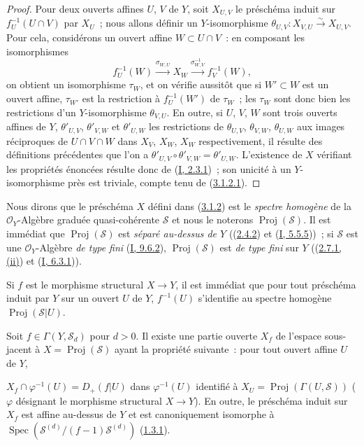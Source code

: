 \begin{proof}
Pour deux ouverts affines $U$, $V$ de $Y$, soit $X_{U,V}$ le préschéma
induit sur $f_U^{-1}(U\cap V)$ par $X_U$~; nous allons définir un
$Y$-isomorphisme $\theta_{U,V}:X_{V,U}\xrightarrow{\sim}X_{U,V}$. Pour cela,
considérons un ouvert affine $W\subset U\cap V$~: en composant les
isomorphismes
\[
  f_U^{-1}(W)\xrightarrow{\sigma_{W,U}}X_W
  \xrightarrow{\sigma_{W,V}^{-1}}f_V^{-1}(W),
\]
on obtient un isomorphisme $\tau_W$, et on vérifie aussitôt que si
$W'\subset W$ est un ouvert affine, $\tau_{W'}$ est la restriction à
$f_U^{-1}(W')$ de $\tau_W$~; les $\tau_W$ sont donc bien les restrictions
d'un $Y$-isomorphisme $\theta_{V,U}$. En outre, si $U$, $V$, $W$ sont trois
ouverts affines de $Y$, $\theta'_{U,V}$, $\theta'_{V,W}$ et
$\theta'_{U,W}$ les restrictions de $\theta_{U,V}$, $\theta_{V,W}$,
$\theta_{U,W}$ aux images réciproques de $U\cap V\cap W$ dans $X_V$, $X_W$,
$X_W$ respectivement, il résulte des définitions précédentes que l'on a
$\theta'_{U,V}\circ\theta'_{V,W}=\theta'_{U,W}$. L'existence de $X$
vérifiant les propriétés énoncées résulte donc de
(\hyperref[I.2.3.1-fr]{I, 2.3.1})~; son unicité à un $Y$-isomorphisme près
est triviale, compte tenu de (\hyperref[II.3.1.2.1-fr]{3.1.2.1}).
\end{proof}

\begin{env}[3.1.3]
\label{II.3.1.3-fr}
Nous dirons que le préschéma $X$ défini dans
(\hyperref[II.3.1.2-fr]{3.1.2}) est le \emph{spectre homogène} de la
$\mathcal{O}_Y$-Algèbre graduée quasi-cohérente $\mathcal{S}$ et nous le
noterons $\operatorname{Proj}(\mathcal{S})$. Il est immédiat que
$\operatorname{Proj}(\mathcal{S})$ est \emph{séparé au-dessus de $Y$}
((\hyperref[II.2.4.2-fr]{2.4.2}) et
(\hyperref[I.5.5.5-fr]{I, 5.5.5}))~; si $\mathcal{S}$ est une
$\mathcal{O}_Y$-Algèbre \emph{de type fini}
(\hyperref[I.9.6.2-fr]{I, 9.6.2}), $\operatorname{Proj}(\mathcal{S})$ est
\emph{de type fini} sur $Y$ ((\hyperref[II.2.7.1-fr]{2.7.1, (ii)}) et
(\hyperref[I.6.3.1-fr]{I, 6.3.1})).

Si $f$ est le morphisme structural $X\to Y$, il est immédiat que pour tout
préschéma induit par $Y$ sur un ouvert $U$ de $Y$, $f^{-1}(U)$ s'identifie au
spectre homogène $\operatorname{Proj}(\mathcal{S}|U)$.
\end{env}

\begin{proposition}[3.1.4]
\label{II.3.1.4-fr}
Soit $f\in\Gamma(Y,\mathcal{S}_d)$ pour $d>0$. Il existe une partie ouverte
$X_f$ de l'espace sous-jacent à $X=\operatorname{Proj}(\mathcal{S})$ ayant la
propriété suivante~: pour tout ouvert affine $U$ de $Y$,


$X_f\cap\varphi^{-1}(U)=D_+(f|U)$ dans $\varphi^{-1}(U)$ identifié à
$X_U=\operatorname{Proj}(\Gamma(U,\mathcal{S}))$ ($\varphi$ désignant le
morphisme structural $X\to Y$). En outre, le préschéma induit sur $X_f$ est
affine au-dessus de $Y$ et est canoniquement isomorphe à
$\operatorname{Spec}(\mathcal{S}^{(d)}/(f-1)\mathcal{S}^{(d)})$
(\hyperref[II.1.3.1-fr]{1.3.1}).
\end{proposition}

